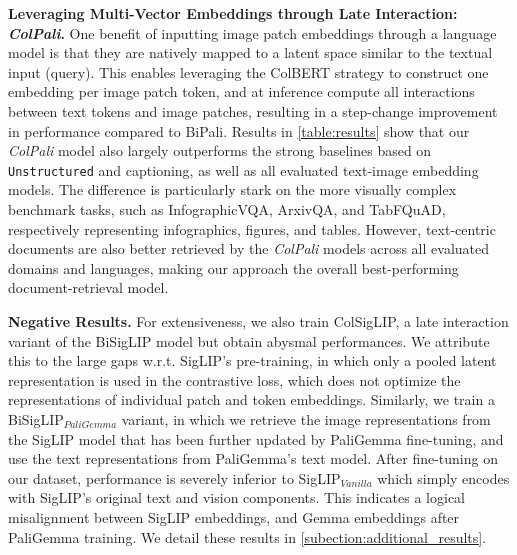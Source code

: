 \documentclass{article} %
\newcommand{\code}[1]{\texttt{#1}}
\begin{document}

\noindent\textbf{Leveraging Multi-Vector Embeddings through Late Interaction: \textit{ColPali}.}
One benefit of inputting image patch embeddings through a language model is that they are natively mapped to a latent space similar to the textual input (query). This enables leveraging the ColBERT strategy to construct one embedding per image patch token, and at inference compute all interactions between text tokens and image patches, resulting in a step-change improvement in performance compared to BiPali. 
Results in \autoref{table:results} show that our \textit{ColPali} model also largely outperforms the strong baselines based on \code{Unstructured} and captioning, as well as all evaluated text-image embedding models. The difference is particularly stark on the more visually complex benchmark tasks, such as InfographicVQA, ArxivQA, and TabFQuAD, respectively representing infographics, figures, and tables. However, text-centric documents are also better retrieved by the \textit{ColPali} models across all evaluated domains and languages, making our approach the overall best-performing document-retrieval model.

\noindent\textbf{Negative Results.} For extensiveness, we also train ColSigLIP, a late interaction variant of the BiSigLIP model but obtain abysmal performances. We attribute this to the large gaps w.r.t. SigLIP's pre-training, in which only a pooled latent representation is used in the contrastive loss, which does not optimize the representations of individual patch and token embeddings. Similarly, we train a BiSigLIP$_{PaliGemma}$ variant, in which we retrieve the image representations from the SigLIP model that has been further updated by PaliGemma fine-tuning, and use the text representations from PaliGemma's text model. After fine-tuning on our dataset, performance is severely inferior to SigLIP$_{Vanilla}$ which simply encodes with SigLIP's original text and vision components. This indicates a logical misalignment between SigLIP embeddings, and Gemma embeddings after PaliGemma training. We detail these results in \autoref{subection:additional_results}.
\end{document}
